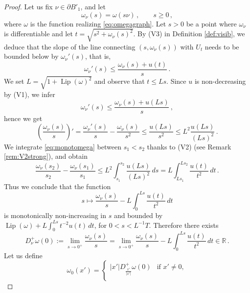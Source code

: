 \documentclass[a4paper,reqno,11pt]{amsart}
\newcommand{\R}{\mathbb{R}}
\newcommand{\de}{\partial}
\newcommand{\Lip}{\mathop{\mathrm{Lip}}}
\begin{document}
	\begin{proof}
		Let us fix $\nu \in \de B'_{1}$, and let
		\begin{equation*}
			\omega_{\nu}(s) = \omega(s\nu) \, , \qquad s \geq 0 \, ,
		\end{equation*}
		where $\omega$ is the function realizing \eqref{eq:omegagraph}. Let $s > 0$ be a point where $\omega_{\nu}$ is differentiable and let $t = \sqrt{s^{2} + \omega_{\nu}(s)^{2}}$. By (V3) in Definition \ref{def:visib}, we deduce that the slope of the line connecting $(s,\omega_{\nu}(s))$ with $U_t$ needs to be bounded below by $\omega_{\nu}'(s)$, that is,
\[
\omega_{\nu}'(s) \leq \dfrac{\omega_{\nu}(s) + u(t)}{s} \, .
\]
We set $L= \sqrt{1 + \Lip(\omega)^{2}}$ and observe that $t \leq L s$. Since $u$ is non-decreasing by (V1), we infer 
\begin{equation*}
\omega_{\nu}'(s) \leq \dfrac{\omega_{\nu}(s) + u(L s)}{s}\,, 
\end{equation*}
hence we get
\begin{equation} \label{eq:monotomega}
\left( \dfrac{\omega_{\nu}(s)}{s} \right)' = \dfrac{\omega_{\nu}'(s)}{s} - \dfrac{\omega_{\nu}(s)}{s^{2}} \leq \dfrac{u(Ls)}{s^{2}} \leq L^{2} \dfrac{u(Ls)}{(L s)^{2}} \, .
\end{equation}
We integrate \eqref{eq:monotomega} between $s_{1} < s_{2}$ thanks to (V2) (see Remark \ref{rem:V2strong}), and obtain
\begin{equation*}
\dfrac{\omega_{\nu}(s_{2})}{s_{2}} - \dfrac{\omega_{\nu}(s_{1})}{s_{1}} \leq L^{2} \int_{s_{1}}^{s_{2}} \dfrac{u(Ls)}{(Ls)^{2}} \, ds = L \int_{L s_{1}}^{L s_{2}} \dfrac{u(t)}{t^{2}} \, dt \, .
\end{equation*}
Thus we conclude that the function
\begin{equation*}
s\mapsto \dfrac{\omega_{\nu}(s)}{s} - L \int_{0}^{L s} \dfrac{u(t)}{t^{2}} \, dt
\end{equation*}
is monotonically non-increasing in $s$ and bounded by $\Lip(\omega) + L \int_{0}^{L s} t^{-2} u(t) \, dt$, for $0 < s < L^{-1} T$. Therefore there exists 
\begin{equation*}
D_{\nu}^{+} \omega(0) := \lim_{s \rightarrow 0^{+}} \dfrac{\omega_{\nu}(s)}{s} = \lim_{s \rightarrow 0^{+}} \dfrac{\omega_{\nu}(s)}{s} - L \int_{0}^{L s} \dfrac{u(t)}{t^{2}} \, dt \in \R\, .
\end{equation*}
Let us define
\begin{equation*}
\omega_{0}(x') = 
\begin{cases}
|x'| D_{\frac{x'}{|x'|}}^{+} \omega (0) & \text{if } x' \neq 0,\\ 

\end{cases}
\end{equation*}
\end{proof}
\end{document}
